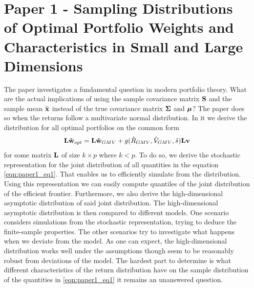 \documentclass[oneside]{book}\usepackage{knitr}
\begin{document}
\section{Paper 1 - Sampling Distributions of Optimal Portfolio Weights and Characteristics in Small and Large Dimensions}\label{sec:paper1}
The paper investigates a fundamental question in modern portfolio theory. 
What are the actual implications of using the sample covariance matrix $\mathbf{S}$ and the sample mean $\bar{\mathbf{x}}$ instead of the true covariance matrix $\mathbf{\Sigma}$ and $\mbox{\boldmath$\mu$}$?
The paper does so when the returns follow a multivariate normal distribution. 
In it we derive the distribution for all optimal portfolios on the common form
\begin{equation}\label{eqn:paper1_eq1}
  \mathbf{L}\mathbf{\hat{w}}_{opt} = \mathbf{L}\mathbf{\hat{w}}_{GMV} + g(\hat{R}_{GMV}, \hat{V}_{GMV}, \hat{s})\mathbf{L}\mathbf{v}
\end{equation}
for some matrix $\mathbf{L}$ of size $k \times p$ where $k<p$.
To do so, we derive the stochastic representation for the joint distribution of all quantities in the equation \eqref{eqn:paper1_eq1}. 
That enables us to efficiently simulate from the distribution.
Using this representation we can easily compute quantiles of the joint distribution of the efficient frontier.
Furthermore, we also derive the high-dimensional asymptotic distribution of said joint distribution. 
The high-dimensional asymptotic distribution is then compared to different models.
One scenario considers simulations from the stochastic representation, trying to deduce the finite-sample properties.
The other scenarios try to investigate what happens when we deviate from the model.
As one can expect, the high-dimensional distribution works well under the assumptions though seem to be reasonably robust from deviations of the model.
The hardest part to determine is what different characteristics of the return distribution have on the sample distribution of the quantities in \eqref{eqn:paper1_eq1} it remains an unanswered question.
\end{document}
